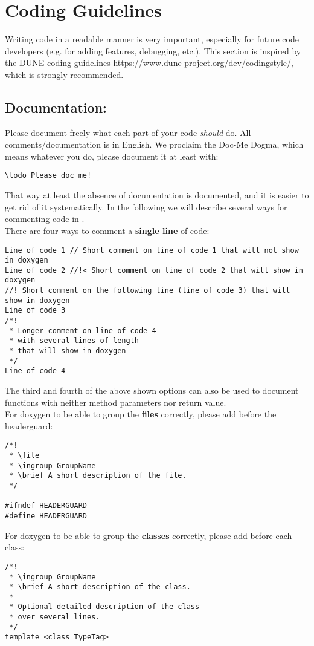 \section{Coding Guidelines}
\label{sc_guidelines}
Writing code in a readable manner is very important, especially
for future code developers (e.g. for adding features, debugging, etc.).
This section is inspired by the DUNE coding guidelines
\url{https://www.dune-project.org/dev/codingstyle/}, which is strongly recommended.

\subsection{Documentation:}
Please document freely what each part of your code \emph{should} do. All comments/documentation
is in English.
We proclaim the Doc-Me Dogma, which means whatever you do, please document
it at least with:
\begin{lstlisting}[style=DumuxCode]
  \todo Please doc me!
\end{lstlisting}
That way at least the absence of documentation is documented, and it is easier
to get rid of it systematically.
In the following we will describe several ways for
commenting code in \Dumux.\\
There are four ways to comment a \textbf{single line} of code:
\begin{lstlisting}[style=DumuxCode]
Line of code 1 // Short comment on line of code 1 that will not show in doxygen
Line of code 2 //!< Short comment on line of code 2 that will show in doxygen
//! Short comment on the following line (line of code 3) that will show in doxygen
Line of code 3
/*!
 * Longer comment on line of code 4 
 * with several lines of length 
 * that will show in doxygen
 */
Line of code 4
\end{lstlisting}
The third and fourth of the above shown options can also be used to document functions with
neither method parameters nor return value.\\
For doxygen to be able to group the \textbf{files} correctly, please add before the headerguard:
\begin{lstlisting}[style=DumuxCode] 
/*!
 * \file
 * \ingroup GroupName
 * \brief A short description of the file.
 */
 
#ifndef HEADERGUARD
#define HEADERGUARD
\end{lstlisting}
For doxygen to be able to group the \textbf{classes} correctly, please add before each class:
\begin{lstlisting}[style=DumuxCode] 
/*!
 * \ingroup GroupName
 * \brief A short description of the class.
 *
 * Optional detailed description of the class
 * over several lines.
 */
template <class TypeTag>
\end{lstlisting}
